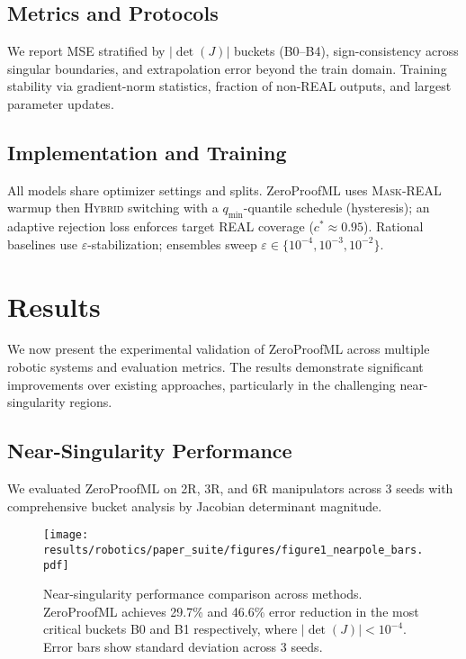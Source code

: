 \documentclass[twoside,11pt]{article}
\newcommand{\trReal}{\textsc{REAL}}
\newcommand{\maskreal}{\textsc{Mask-REAL}}
\newcommand{\hybrid}{\textsc{Hybrid}}
\newcommand{\qmin}{q_{\min}}
\begin{document}
\subsection{Metrics and Protocols}
We report MSE stratified by $|\det(J)|$ buckets (B0--B4), sign-consistency across singular boundaries, and extrapolation error beyond the train domain. Training stability via gradient-norm statistics, fraction of non-\trReal{} outputs, and largest parameter updates.
\subsection{Implementation and Training}
All models share optimizer settings and splits. ZeroProofML uses \maskreal{} warmup then \hybrid{} switching with a $\qmin$-quantile schedule (hysteresis); an adaptive rejection loss enforces target \trReal{} coverage ($c^\ast\!\approx\!0.95$). Rational baselines use $\varepsilon$-stabilization; ensembles sweep $\varepsilon\in\{10^{-4},10^{-3},10^{-2}\}$.

\section{Results}
\label{sec:results}
We now present the experimental validation of ZeroProofML across multiple robotic systems and evaluation metrics. The results demonstrate significant improvements over existing approaches, particularly in the challenging near-singularity regions.

\subsection{Near-Singularity Performance}

We evaluated ZeroProofML on 2R, 3R, and 6R manipulators across 3 seeds with comprehensive bucket analysis by Jacobian determinant magnitude.

\begin{figure}[t]
\centering
\texttt{[image: results/robotics/paper\_suite/figures/figure1\_nearpole\_bars.pdf]}
\caption{Near-singularity performance comparison across methods. ZeroProofML achieves 29.7\% and 46.6\% error reduction in the most critical buckets B0 and B1 respectively, where $|\det(J)| < 10^{-4}$. Error bars show standard deviation across 3 seeds.}
\label{fig:nearpole_performance}
\end{figure}

\end{document}
